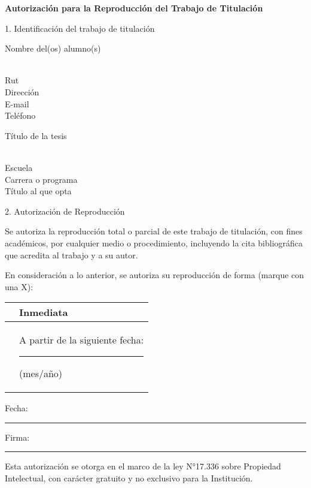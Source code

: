 \begin{singlespace}
    \begin{center}
        \large \textbf{Autorización para la Reproducción del Trabajo de Titulación}
    \end{center}
    \vspace{1cm}
    
    1. Identificación del trabajo de titulación
    
    Nombre del(os) alumno(s)
    
    \dotfill \\
    Rut \dotfill \\
    Dirección \dotfill \\
    E-mail \dotfill \\
    Teléfono \dotfill

    Título de la tesis

    \dotfill \\
    Escuela \dotfill \\
    Carrera o programa \dotfill \\
    Título al que opta \dotfill

    2. Autorización de Reproducción %


    Se autoriza la reproducción total o parcial de este trabajo de titulación, con fines académicos, por cualquier medio o procedimiento, incluyendo la cita bibliográfica que acredita al trabajo y a su autor.
    
    En consideración a lo anterior, se autoriza su reproducción de forma (marque con una X):

    \begin{table}[h]
        \centering
        \renewcommand{\arraystretch}{2}

        \begin{tabularx}{\textwidth}{|p{2cm}|X|}
            \hline
             & Inmediata \\
            \hline
             & A partir de la siguiente fecha: \rule{2cm}{0.4pt} (mes/año) \\
            \hline
        \end{tabularx}
    \end{table}

    \vfill

    Fecha: \rule{4cm}{0.4pt} \hfill Firma: \rule{4cm}{0.4pt} \hspace{2cm}

    \vspace{1cm}

    Esta autorización se otorga en el marco de la ley N°17.336 sobre Propiedad Intelectual, con carácter gratuito y no exclusivo para la Institución.
    
\end{singlespace}
